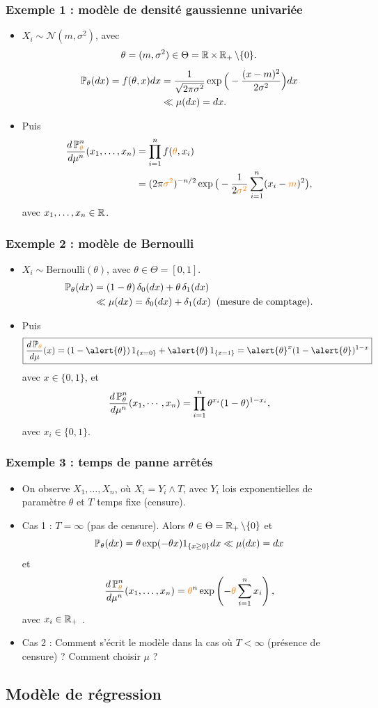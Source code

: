 \begin{frame}
\frametitle{Exemple 1 : modèle de densité gaussienne univariée}
\begin{itemize}
\item $X_i\sim {\mathcal N}(m,\sigma^2)$,
avec
$$\theta = (m,\sigma^2) \in \Theta = \operatorname{{\mathbb R}}\times \operatorname{{\mathbb R}}_+\setminus\{0\}.$$
\begin{align*}
\operatorname{{\mathbb P}}_\theta(dx) = f(\theta,x)dx & =\frac{1}{\sqrt{2\pi \sigma^2}}\exp\Big(-\frac{(x-m)^2}{2\sigma^2}\Big)dx \\
& \ll \mu(dx)=dx.
\end{align*}
\item Puis
\begin{align*}
\frac{d\PP_{\tco{\theta}}^n}{d\mu^n}(x_1,\ldots, x_n) & = \prod_{i = 1}^n f(\tco{\theta},x_i) \\
& =(2\pi \tco{\sigma^2})^{-n/2}\exp\big(-\frac{1}{2\tco{\sigma^2}}\sum_{i = 1}^n (x_i-\tco{m})^2\big),
\end{align*}
avec $x_1,\ldots,x_n \in \operatorname{{\mathbb R}}$.
\end{itemize}
\end{frame}

\begin{frame}
\frametitle{Exemple 2 :  modèle de Bernoulli}
\begin{itemize}
\item $X_i \sim \text{Bernoulli}(\theta)$, avec $\theta \in \Theta = [0,1]$.
\begin{align*}
\operatorname{{\mathbb P}}_\theta(dx)& = (1-\theta)\, \delta_{0}(dx) + \theta\, \delta_1(dx) \\
& \ll \mu(dx) = \delta_0(dx)+\delta_1(dx)\;\;\text{(mesure de comptage)}.
\end{align*}
\item Puis
$$\boxed{\frac{d\PP_{\tco{\theta}}}{d\mu}(x) = (1-\alert{\theta})\,1_{\{x=0\}}+\alert{\theta}\,1_{\{x=1\}} = \alert{\theta}^x(1-\alert{\theta})^{1-x}}$$
\alert{avec $x\in \{0,1\}$}, et
$$\frac{d\operatorname{{\mathbb P}}_\theta^n}{d\mu^n}(x_1,\cdots, x_n) = \prod_{i = 1}^n \theta^{x_i}(1-\theta)^{1-x_i},$$
\alert{avec $x_i \in \{0,1\}$}.
\end{itemize}
\end{frame}

\begin{frame}
\frametitle{Exemple 3 : temps de panne arrêtés}
\begin{itemize}
\item On observe $X_1,\ldots, X_n$, où $X_i = Y_i \wedge T$, avec $Y_i$ \alert{lois exponentielles} de paramètre $\theta$ et $T$ \alert{temps fixe} (censure).
\item Cas 1 : $T=\infty$ (pas de censure). Alors  $\theta \in \Theta = \operatorname{{\mathbb R}}_+\setminus \{0\}$ et
$$\operatorname{{\mathbb P}}_\theta(dx) = \theta \exp(-\theta x)1_{\{x \geq 0\}}dx \ll \mu(dx) = dx$$
et
$$
\frac{d\PP_{\tco{\theta}}^n}{d\mu^n}(x_1,\ldots,x_n) = \tco{\theta}^n \exp\left(-\tco{\theta} \sum_{i = 1}^n x_i\right),
$$
\alert{avec $x_i \in \operatorname{{\mathbb R}}_+$} .
\item Cas 2 : \alert{Comment s'écrit le modèle} dans la cas où $T<\infty$ (présence de censure) ? Comment choisir $\mu$ ?
\end{itemize}
\end{frame}




\subsection{Modèle de régression}


